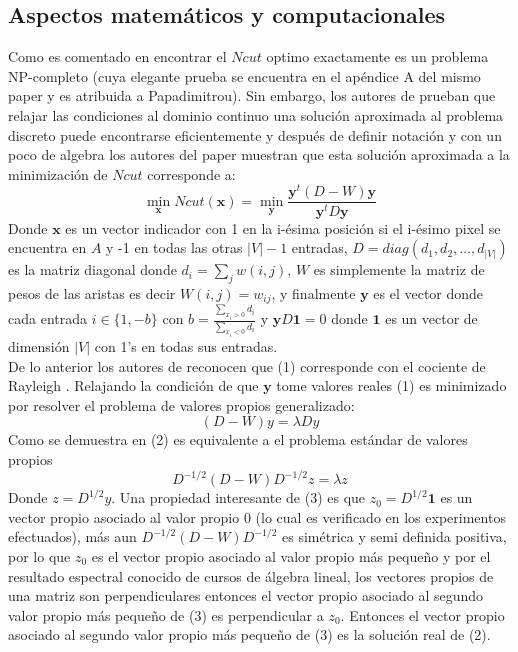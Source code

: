 \documentclass[conference]{IEEEtran}
\begin{document}
\subsection{Aspectos matemáticos y computacionales}
Como es comentado en \cite{Ncut} encontrar el $Ncut$ optimo exactamente es un problema NP-completo (cuya elegante prueba se encuentra en el apéndice A del mismo paper \cite{Ncut} y es atribuida a Papadimitrou). Sin embargo, los autores de \cite{Ncut} prueban que relajar las condiciones al dominio continuo una solución aproximada al problema discreto puede encontrarse eficientemente y después de definir notación y con un poco de algebra los autores del paper muestran que esta solución aproximada a la minimización de $Ncut$ corresponde a:
\begin{equation}
\min_{\boldsymbol{x}}Ncut(\boldsymbol{x}) = \min_{\boldsymbol{y}} \frac{\boldsymbol{y}^t(D-W)\boldsymbol{y}}{\boldsymbol{y}^tD\boldsymbol{y}}
\end{equation}
Donde $ \boldsymbol{x}$ es un vector indicador con 1 en la i-ésima posición si el i-ésimo pixel se encuentra en $A$ y -1 en todas las otras $|V|-1$ entradas, $D=diag(d_1,d_2,…,d_{|V|})$ es la matriz diagonal donde $d_i=\sum_j w(i,j)$, $W$ es simplemente la matriz de pesos de las aristas es decir $W (i,j)=w_{ij}$, y finalmente $ \boldsymbol{y}$ es el vector donde cada entrada $i\in \{1,-b\}$ con $b = \frac{\sum_{x_i>0}d_i}{\sum_{x_i<0}d_i}$ y $ \boldsymbol{y}D \boldsymbol{1} = 0$ donde $ \boldsymbol{1}$ es un vector de dimensión $|V|$ con 1’s en todas sus entradas. \\
De lo anterior los autores de \cite{Ncut} reconocen que (1) corresponde con el cociente de Rayleigh \cite{MatrixC}. Relajando la condición de que $\boldsymbol{y}$
 tome valores reales (1) es minimizado por resolver el problema de valores propios generalizado:
\begin{equation}
(D-W)y = \lambda D y
\end{equation}
Como se demuestra en \cite{Ncut}  (2) es equivalente a el problema estándar de valores propios 
\begin{equation}
D^{-1/2}(D-W)D^{-1/2}z = \lambda z
\end{equation}
Donde $z=D^{1/2} y$. Una propiedad interesante de (3) es que $z_0= D^{1/2} \boldsymbol{1}$ es un vector propio asociado al valor propio 0 (lo cual es verificado en los experimentos efectuados), más aun $ D^{-1/2}(D-W)D^{-1/2}$ es simétrica y semi definida positiva, por lo que $z_0$ es el vector propio asociado al valor propio más pequeño y por el resultado espectral conocido de cursos de álgebra lineal, los vectores propios de una matriz son perpendiculares entonces el vector propio asociado al segundo valor propio más pequeño de (3) es perpendicular a $z_0$. Entonces el vector propio asociado al segundo valor propio más pequeño de (3) es la solución real de (2). \\
\end{document}
